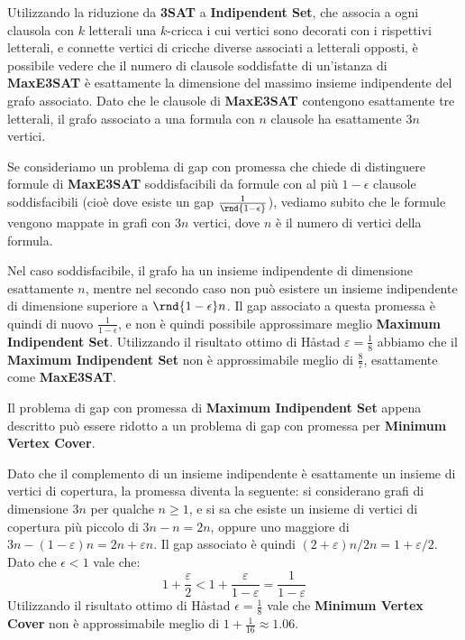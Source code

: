 \documentclass[\main/main.tex]{subfiles}
\begin{document}
\begin{multicols}{2}
\begin{example}
    Utilizzando la riduzione da \textbf{3SAT} a \textbf{Indipendent Set}, che associa a ogni clausola con \(k\) letterali una \(k\)-cricca i cui vertici sono decorati con i rispettivi letterali, e connette vertici di cricche diverse associati a letterali opposti, è possibile vedere che il numero di clausole soddisfatte di un'istanza di \textbf{MaxE3SAT} è esattamente la dimensione del massimo insieme indipendente del grafo associato. Dato che le clausole di \textbf{MaxE3SAT} contengono esattamente tre letterali, il grafo associato a una formula con \(n\) clausole ha esattamente \(3n\) vertici.
    
    Se consideriamo un problema di gap con promessa che chiede di distinguere formule di \textbf{MaxE3SAT} soddisfacibili da formule con al più \(1-\epsilon\) clausole soddisfacibili (cioè dove esiste un gap \(\frac{1}{\rnd{1-\epsilon}}\)), vediamo subito che le formule vengono mappate in grafi con \(3n\) vertici, dove \(n\) è il numero di vertici della formula.
    
    Nel caso soddisfacibile, il grafo ha un insieme indipendente di dimensione esattamente \(n\), mentre nel secondo caso non può esistere un insieme indipendente di dimensione superiore a \(\rnd{1-\epsilon}n\). Il gap associato a questa promessa è quindi di nuovo \(\frac{1}{1-\epsilon}\), e non è quindi possibile approssimare meglio \textbf{Maximum Indipendent Set}. Utilizzando il risultato ottimo di Håstad \(\varepsilon=\frac{1}{8}\) abbiamo che il \textbf{Maximum Indipendent Set} non è approssimabile meglio di \(\frac{8}{7}\), esattamente come \textbf{MaxE3SAT}.
\end{example}
\begin{example}
    Il problema di gap con promessa di \textbf{Maximum Indipendent Set} appena descritto può essere ridotto a un problema di gap con promessa per \textbf{Minimum Vertex Cover}.
    
    Dato che il complemento di un insieme indipendente è esattamente un insieme di vertici di copertura, la promessa diventa la seguente: si considerano grafi di dimensione \(3n\) per qualche \(n\geq 1\), e si sa che esiste un insieme di vertici di copertura più piccolo di \(3n -n=2n\), oppure uno maggiore di \(3 n-(1-\varepsilon) n= 2 n+\varepsilon n\). Il gap associato è quindi \((2+\varepsilon) n / 2 n=1+\varepsilon / 2\). Dato che \(\epsilon < 1\) vale che:
    \[
        1+\frac{\varepsilon}{2}<1+\frac{\varepsilon}{1-\varepsilon}=\frac{1}{1-\varepsilon}
    \]
    Utilizzando il risultato ottimo di Håstad \(\epsilon = \frac{1}{8}\) vale che \textbf{Minimum Vertex Cover} non è approssimabile meglio di \(1+\frac{1}{16} \approx 1.06\).
\end{example}
\end{multicols}
\clearpage
\end{document}
